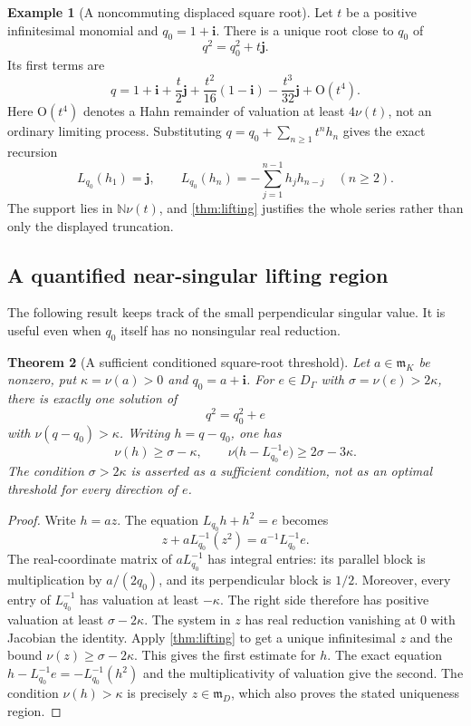 \documentclass[11pt,letterpaper]{article}
\newtheorem{theorem}{Theorem}[section]
\theoremstyle{definition}
\newtheorem{example}[theorem]{Example}
\newcommand{\N}{\mathbb N}
\newcommand{\DG}{D_\Gamma}
\newcommand{\mm}{\mathfrak m}
\newcommand{\ii}{\mathbf i}
\newcommand{\jj}{\mathbf j}
\newcommand{\val}{\nu}
\newcommand{\bigO}{\mathrm{O}}
\begin{document}
\begin{example}[A noncommuting displaced square root]
Let $t$ be a positive infinitesimal monomial and $q_0=1+\ii$. There is a unique
root close to $q_0$ of
\[
 q^2=q_0^2+t\jj.
\]
Its first terms are
\begin{equation}
 q=1+\ii+\frac{t}{2}\jj
       +\frac{t^2}{16}(1-\ii)-\frac{t^3}{32}\jj+\bigO(t^4).
 \label{eq:sqrt-example}
\end{equation}
Here $\bigO(t^4)$ denotes a Hahn remainder of valuation at least $4\val(t)$,
not an ordinary limiting process. Substituting $q=q_0+\sum_{n\geq1}t^nh_n$
gives the exact recursion
\[
 L_{q_0}(h_1)=\jj,\qquad
 L_{q_0}(h_n)=-\sum_{j=1}^{n-1}h_jh_{n-j}\quad(n\geq2).
\]
The support lies in $\N\val(t)$, and \cref{thm:lifting} justifies the whole
series rather than only the displayed truncation.
\end{example}

\subsection{A quantified near-singular lifting region}
The following result keeps track of the small perpendicular singular value.
It is useful even when $q_0$ itself has no nonsingular real reduction.

\begin{theorem}[A sufficient conditioned square-root threshold]
\label{thm:conditioned}
Let $a\in\mm_K$ be nonzero, put $\kappa=\val(a)>0$ and $q_0=a+\ii$.
For $e\in\DG$ with $\sigma=\val(e)>2\kappa$, there is exactly one solution
of
\[
 q^2=q_0^2+e
\]
with $\val(q-q_0)>\kappa$. Writing $h=q-q_0$, one has
\begin{equation}
 \val(h)\geq\sigma-\kappa,\qquad
 \val\bigl(h-L_{q_0}^{-1}e\bigr)\geq2\sigma-3\kappa.
 \label{eq:conditioned-bounds}
\end{equation}
The condition $\sigma>2\kappa$ is asserted as a sufficient condition, not
as an optimal threshold for every direction of $e$.
\end{theorem}
\begin{proof}
Write $h=az$. The equation $L_{q_0}h+h^2=e$ becomes
\[
 z+aL_{q_0}^{-1}(z^2)=a^{-1}L_{q_0}^{-1}e.
\]
The real-coordinate matrix of $aL_{q_0}^{-1}$ has integral entries: its
parallel block is multiplication by $a/(2q_0)$, and its perpendicular block
is $1/2$. Moreover, every entry of $L_{q_0}^{-1}$ has valuation at least
$-\kappa$. The right side therefore has positive valuation at least
$\sigma-2\kappa$. The system in $z$ has real reduction vanishing at $0$ with
Jacobian the identity. Apply \cref{thm:lifting} to get a unique infinitesimal
$z$ and the bound $\val(z)\geq\sigma-2\kappa$. This gives the first estimate
for $h$. The exact equation
$h-L_{q_0}^{-1}e=-L_{q_0}^{-1}(h^2)$ and the multiplicativity of valuation give
the second. The condition $\val(h)>\kappa$ is precisely $z\in\mm_D$, which
also proves the stated uniqueness region.
\end{proof}
\end{document}
